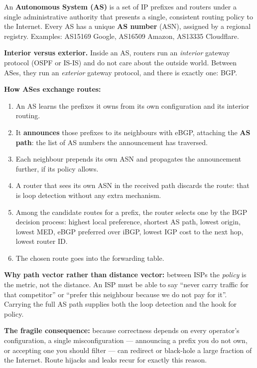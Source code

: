 \documentclass[11pt,a4paper]{article}
\begin{document}
\begin{solbox}
An \textbf{Autonomous System (AS)} is a set of IP prefixes and routers under a single administrative authority that presents a single, consistent routing policy to the Internet. Every AS has a unique \textbf{AS number} (ASN), assigned by a regional registry. Examples: AS15169 Google, AS16509 Amazon, AS13335 Cloudflare.

\textbf{Interior versus exterior.} Inside an AS, routers run an \emph{interior} gateway protocol (OSPF or IS-IS) and do not care about the outside world. Between ASes, they run an \emph{exterior} gateway protocol, and there is exactly one: BGP.

\textbf{How ASes exchange routes:}
\begin{enumerate}
\item An AS learns the prefixes it owns from its own configuration and its interior routing.
\item It \textbf{announces} those prefixes to its neighbours with eBGP, attaching the \textbf{AS path}: the list of AS numbers the announcement has traversed.
\item Each neighbour prepends its own ASN and propagates the announcement further, if its policy allows.
\item A router that sees its own ASN in the received path discards the route: that is loop detection without any extra mechanism.
\item Among the candidate routes for a prefix, the router selects one by the BGP decision process: highest local preference, shortest AS path, lowest origin, lowest MED, eBGP preferred over iBGP, lowest IGP cost to the next hop, lowest router ID.
\item The chosen route goes into the forwarding table.
\end{enumerate}

\textbf{Why path vector rather than distance vector:} between ISPs the \emph{policy} is the metric, not the distance. An ISP must be able to say ``never carry traffic for that competitor'' or ``prefer this neighbour because we do not pay for it''. Carrying the full AS path supplies both the loop detection and the hook for policy.

\textbf{The fragile consequence:} because correctness depends on every operator's configuration, a single misconfiguration --- announcing a prefix you do not own, or accepting one you should filter --- can redirect or black-hole a large fraction of the Internet. Route hijacks and leaks recur for exactly this reason.
\end{solbox}
\end{document}

